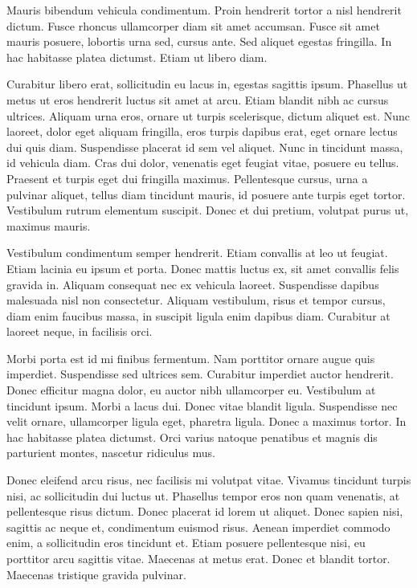 Mauris bibendum vehicula condimentum. Proin hendrerit tortor a nisl hendrerit dictum. Fusce rhoncus ullamcorper diam sit amet accumsan. Fusce sit amet mauris posuere, lobortis urna sed, cursus ante. Sed aliquet egestas fringilla. In hac habitasse platea dictumst. Etiam ut libero diam.

Curabitur libero erat, sollicitudin eu lacus in, egestas sagittis ipsum. Phasellus ut metus ut eros hendrerit luctus sit amet at arcu. Etiam blandit nibh ac cursus ultrices. Aliquam urna eros, ornare ut turpis scelerisque, dictum aliquet est. Nunc laoreet, dolor eget aliquam fringilla, eros turpis dapibus erat, eget ornare lectus dui quis diam. Suspendisse placerat id sem vel aliquet. Nunc in tincidunt massa, id vehicula diam. Cras dui dolor, venenatis eget feugiat vitae, posuere eu tellus. Praesent et turpis eget dui fringilla maximus. Pellentesque cursus, urna a pulvinar aliquet, tellus diam tincidunt mauris, id posuere ante turpis eget tortor. Vestibulum rutrum elementum suscipit. Donec et dui pretium, volutpat purus ut, maximus mauris.

Vestibulum condimentum semper hendrerit. Etiam convallis at leo ut feugiat. Etiam lacinia eu ipsum et porta. Donec mattis luctus ex, sit amet convallis felis gravida in. Aliquam consequat nec ex vehicula laoreet. Suspendisse dapibus malesuada nisl non consectetur. Aliquam vestibulum, risus et tempor cursus, diam enim faucibus massa, in suscipit ligula enim dapibus diam. Curabitur at laoreet neque, in facilisis orci.

Morbi porta est id mi finibus fermentum. Nam porttitor ornare augue quis imperdiet. Suspendisse sed ultrices sem. Curabitur imperdiet auctor hendrerit. Donec efficitur magna dolor, eu auctor nibh ullamcorper eu. Vestibulum at tincidunt ipsum. Morbi a lacus dui. Donec vitae blandit ligula. Suspendisse nec velit ornare, ullamcorper ligula eget, pharetra ligula. Donec a maximus tortor. In hac habitasse platea dictumst. Orci varius natoque penatibus et magnis dis parturient montes, nascetur ridiculus mus.

Donec eleifend arcu risus, nec facilisis mi volutpat vitae. Vivamus tincidunt turpis nisi, ac sollicitudin dui luctus ut. Phasellus tempor eros non quam venenatis, at pellentesque risus dictum. Donec placerat id lorem ut aliquet. Donec sapien nisi, sagittis ac neque et, condimentum euismod risus. Aenean imperdiet commodo enim, a sollicitudin eros tincidunt et. Etiam posuere pellentesque nisi, eu porttitor arcu sagittis vitae. Maecenas at metus erat. Donec et blandit tortor. Maecenas tristique gravida pulvinar.

